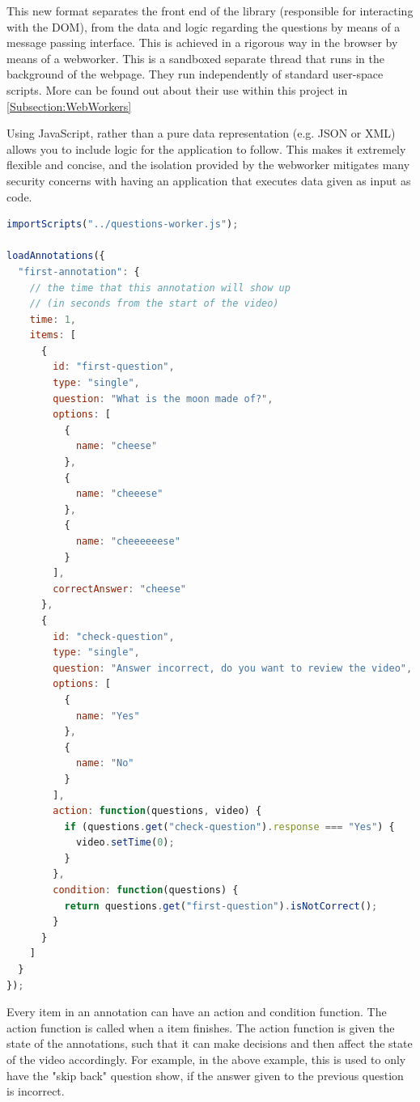 This new format separates the front end of the library (responsible for
interacting with the \gls{DOM}), from the data and logic regarding the questions by
means of a message passing interface. This is achieved in a rigorous way in the
browser by means of a \gls{webworker}. This is a sandboxed separate thread that runs
in the background of the webpage. They run independently of standard user-space
scripts.  More can be found out about their use within this project in \autoref{Subsection:WebWorkers}

Using JavaScript, rather than a pure data representation (e.g. JSON or XML)
allows you to include logic for the application to follow. This makes it extremely
flexible and concise, and the isolation provided by the \gls{webworker} mitigates
many security concerns with having an application that executes data given as
input as code.

\begin{lstlisting}[language=javascript,caption={\label{code:questionworker} Code for loading an annotation}]
importScripts("../questions-worker.js");

loadAnnotations({
  "first-annotation": {
    // the time that this annotation will show up
    // (in seconds from the start of the video)
    time: 1,
    items: [
      {
        id: "first-question",
        type: "single",
        question: "What is the moon made of?",
        options: [
          {
            name: "cheese"
          },
          {
            name: "cheeese"
          },
          {
            name: "cheeeeeese"
          }
        ],
        correctAnswer: "cheese"
      },
      {
        id: "check-question",
        type: "single",
        question: "Answer incorrect, do you want to review the video",
        options: [
          {
            name: "Yes"
          },
          {
            name: "No"
          }
        ],
        action: function(questions, video) {
          if (questions.get("check-question").response === "Yes") {
            video.setTime(0);
          }
        },
        condition: function(questions) {
          return questions.get("first-question").isNotCorrect();
        }
      }
    ]
  }
});
\end{lstlisting}

Every item in an annotation can have an action and condition function. The
action function is called when a item finishes. The action function is given
the state of the annotations, such that it can make decisions and then affect
the state of the video accordingly. For example, in the above example, this is
used to only have the "skip back" question show, if the answer given to the
previous question is incorrect.

